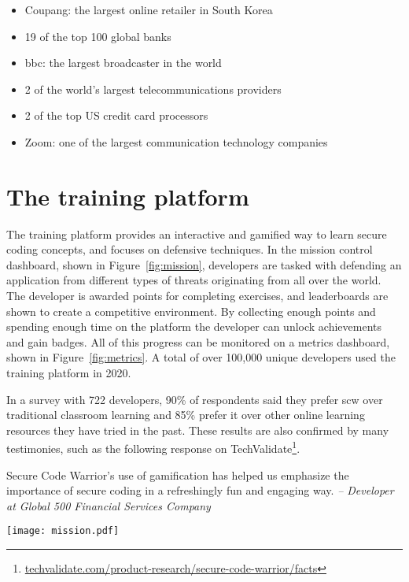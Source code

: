 \begin{itemize}
\setlength\itemsep{0em}
    \item Coupang: the largest online retailer in South Korea
    \item 19 of the top 100 global banks
    \item \gls{bbc}: the largest broadcaster in the world
    \item 2 of the world's largest telecommunications providers
    \item 2 of the top US credit card processors
    \item Zoom: one of the largest communication technology companies
\end{itemize}

\section{The training platform}

The training platform provides an interactive and gamified way to learn secure coding concepts, and focuses on defensive techniques. 
In the mission control dashboard, shown in Figure~\ref{fig:mission}, developers are tasked with defending an application from different types of threats originating from all over the world.
The developer is awarded points for completing exercises, and leaderboards are shown to create a competitive environment.
By collecting enough points and spending enough time on the platform the developer can unlock achievements and gain badges.
All of this progress can be monitored on a metrics dashboard, shown in Figure~\ref{fig:metrics}.
A total of over 100,000 unique developers used the training platform in 2020.

In a survey with 722 developers, 90\% of respondents said they prefer \gls{scw} over traditional classroom learning
and 85\% prefer it over other online learning resources they have tried in the past.
These results are also confirmed by many testimonies, such as the following response on TechValidate\footnote{\url{techvalidate.com/product-research/secure-code-warrior/facts}}. 

\begin{displayquote}
Secure Code Warrior’s use of gamification has helped us emphasize the importance of secure coding in a refreshingly fun and engaging way. \textit{-- Developer at Global 500 Financial Services Company}
\end{displayquote}

\begin{sidewaysfigure}
  \centering
  \texttt{[image: mission.pdf]}
  \caption[SCW mission control dashboard]{The mission control dashboard on the \gls{scw} platform creates a gamified overview of the exercises.}
  \label{fig:mission} 
\end{sidewaysfigure}


